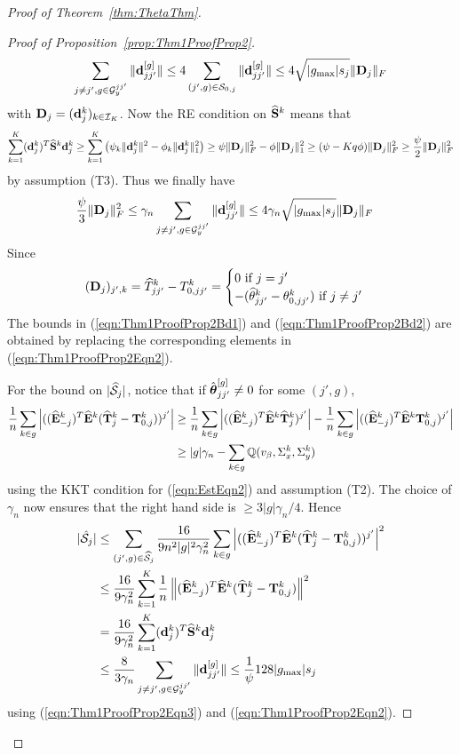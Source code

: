 \documentclass[12pt, letterpaper]{article}
\theoremstyle{definition}
\numberwithin{equation}{section}
\begin{document}
\begin{proof}[Proof of Theorem~\ref{thm:ThetaThm}]
\begin{proof}[Proof of Proposition~\ref{prop:Thm1ProofProp2}]
$$\sum_{j \neq j', g \in {\cal{G}}_y^{jj'}} \| {\bf{d}}_{jj'}^{[g]} \| \leq
4 \sum_{(j',g) \in {\cal{S}}_{0,j}} \| {\bf{d}}_{jj'}^{[g]} \| \leq 4 \sqrt{| g_{\max}| s_j} \| {\mathbf{D}}_j \|_F
$$
% 
with ${\mathbf{D}}_j = ({\bf{d}}_j^k)_{k \in {\cal{I}}_K}$. Now the RE condition on $\widehat {{\mathbf{S}}}^k$ means that
%
$$
\sum_{k=1}^K ({\bf{d}}_j^k)^T \widehat {{\mathbf{S}}}^k {\bf{d}}_j^k \geq 
\sum_{k=1}^K \left( \psi_k \| {\bf{d}}_j^k \|^2 - \phi_k \| {\bf{d}}_j^k \|_1^2 \right) \geq
\psi \| {\mathbf{D}}_j \|_F^2 - \phi \| {\mathbf{D}}_j \|_1^2 \geq 
(\psi - Kq \phi ) \| {\mathbf{D}}_j \|_F^2 \geq \frac{\psi}{2}  \| {\mathbf{D}}_j \|_F^2
$$
%
by assumption (T3). Thus we finally have
%
\begin{align}\label{eqn:Thm1ProofProp2Eqn2}
\frac{\psi}{3} \| {\mathbf{D}}_j \|_F^2 & \leq
\gamma_n \sum_{j \neq j', g \in {\cal{G}}_y^{jj'}} \| {\bf{d}}_{jj'}^{[g]} \| \leq
4 \gamma_n \sqrt{| g_{\max}| s_j} \| {\mathbf{D}}_j\|_F
\end{align}
%
Since
%
$$
({\mathbf{D}}_j)_{j',k} = \widehat T_{jj'}^k - T_{0,jj'}^k = \begin{cases}
0 \text{ if } j = j'\\
-(\widehat \theta_{jj'}^k - \theta_{0,jj'}^k ) \text{ if } j \neq j'
\end{cases}
$$
%
The bounds in (\ref{eqn:Thm1ProofProp2Bd1}) and (\ref{eqn:Thm1ProofProp2Bd2}) are obtained by replacing the corresponding elements in (\ref{eqn:Thm1ProofProp2Eqn2}).

For the bound on $| \widehat {{\cal{S}}}_j|$, notice that if $\hat {{\boldsymbol{\theta}}}_{jj'}^{[g]} \neq 0$ for some $(j',g)$,
%
\begin{align*}
\frac{1}{n} \sum_{k \in g} \left| ((\widehat {{\mathbf{E}}}_{-j}^k)^T \widehat {{\mathbf{E}}}^k ( \widehat {{\mathbf{T}}}_j^k - {\mathbf{T}}_{0,j}^k ))^{j'} \right| & \geq
\frac{1}{n} \sum_{k \in g} \left| ((\widehat {{\mathbf{E}}}_{-j}^k)^T \widehat {{\mathbf{E}}}^k \widehat {{\mathbf{T}}}_j^k )^{j'} \right| - \frac{1}{n} \sum_{k \in g} \left| ((\widehat {{\mathbf{E}}}_{-j}^k)^T \widehat {{\mathbf{E}}}^k {\mathbf{T}}_{0,j}^k )^{j'} \right|\\
& \geq |g| \gamma_n - \sum_{k \in g} {\mathbb{Q}} ( v_\beta, \Sigma_x^k, \Sigma_y^k )
\end{align*}
%
using the KKT condition for (\ref{eqn:EstEqn2}) and assumption (T2). The choice of $\gamma_n$ now ensures that the right hand side is $\geq 3|g| \gamma_n / 4$. Hence
%
\begin{align*}
| \hat {{\cal{S}}}_j| & \leq \sum_{(j',g) \in \widehat {{\cal{S}}}_j} \frac{16}{9 n^2 |g|^2 \gamma_n^2 } \sum_{k \in g} \left| ((\widehat {{\mathbf{E}}}_{-j}^k)^T \widehat {{\mathbf{E}}}^k ( \widehat {{\mathbf{T}}}_j^k - {\mathbf{T}}_{0,j}^k ))^{j'} \right|^2\\
& \leq \frac{16}{9 \gamma_n^2} \sum_{k=1}^K \frac{1}{n} \left\| (\widehat {{\mathbf{E}}}_{-j}^k)^T \widehat {{\mathbf{E}}}^k ( \widehat {{\mathbf{T}}}_j^k - {\mathbf{T}}_{0,j}^k ) \right\|^2 \\
& = \frac{16}{9 \gamma_n^2} \sum_{k=1}^K ({\bf{d}}_j^k)^T \widehat {{\mathbf{S}}}^k {\bf{d}}_j^k \\
& \leq \frac{8}{3 \gamma_n} \sum_{j \neq j', g \in {\cal{G}}_y^{jj'}} \| {\bf{d}}_{jj'}^{[g]} \| \leq \frac{1}{\psi} 128 | g_{\max}| s_j 
\end{align*}
%
using (\ref{eqn:Thm1ProofProp2Eqn3}) and (\ref{eqn:Thm1ProofProp2Eqn2}).


\end{proof}
\end{proof}
\end{document}
